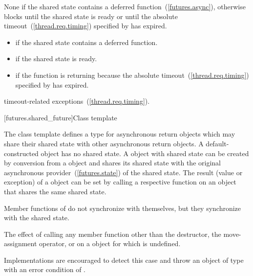 \begin{itemdescr}
\pnum
\effects
None if the shared state contains a deferred function~(\ref{futures.async}),
otherwise
blocks until the shared state is ready or until
the absolute timeout~(\ref{thread.req.timing}) specified by  has expired.

\pnum
\returns

\begin{itemize}
\item {} if the shared state contains a deferred
function.

\item {} if the shared state is ready.

\item {} if the function is returning because the
absolute timeout~(\ref{thread.req.timing})
specified by  has expired.
\end{itemize}

\pnum
\throws
timeout-related exceptions~(\ref{thread.req.timing}).
\end{itemdescr}


[futures.shared_future]{Class template }

\pnum
The class template  defines a type for asynchronous return objects
which may share their shared state with other asynchronous return
objects. A default-constructed 
object has no shared state. A  object with
shared state can
be created
by conversion from a  object and shares its shared state with the
original asynchronous provider~(\ref{futures.state}) of the shared state.
The result (value or exception) of a  object
can be set by
calling a respective function on an
object that shares the same shared state.

\pnum
\begin{note} Member functions of  do not synchronize with themselves,
but they synchronize with the shared state. \end{note}

\pnum
The effect of calling any member function other than the destructor, the move-assignment
operator, or  on a  object for which  is undefined.
\begin{note} Implementations are encouraged to detect this case and throw an object of type
 with an error condition of . \end{note}


